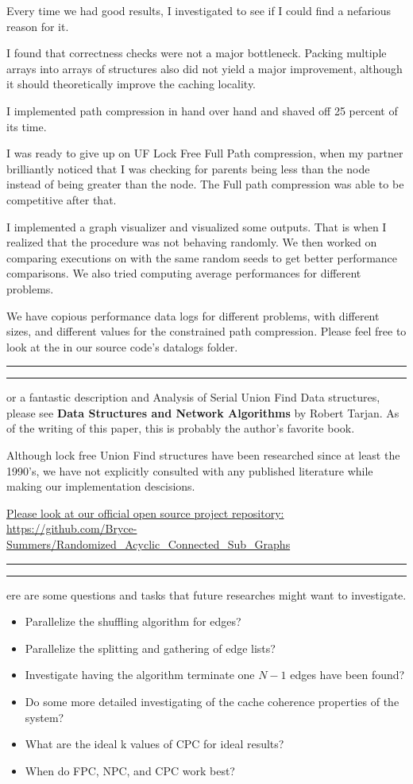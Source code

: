 \documentclass[11pt]{article}
\newcommand{\question}[2] {\vspace{.25in} \hrule\vspace{0.5em}
\noindent{\bf #1: #2} \vspace{0.5em}
\hrule \vspace{.10in}}
\begin{document}
Every time we had good results, I investigated to see if I could find a nefarious reason for it.

I found that correctness checks were not a major bottleneck. Packing multiple arrays into arrays of structures also did not yield a major improvement, although it should theoretically improve the caching locality.

I implemented path compression in hand over hand and shaved off 25 percent of its time.

I was ready to give up on UF Lock Free Full Path compression, when my partner brilliantly noticed that I was checking for parents being less than the node instead of being greater than the node. The Full path compression was able to be competitive after that.

I implemented a graph visualizer and visualized some outputs. That is when I realized that the procedure was not behaving randomly. We then worked on comparing executions on with the same random seeds to get better performance comparisons. We also tried computing average performances for different problems.

We have copious performance data logs for different problems, with different sizes, and different values for the constrained path compression. Please feel free to look at the in our source code's datalogs folder.


\newpage

\question{References}

For a fantastic description and Analysis of Serial Union Find Data structures, please see \textbf{Data Structures and Network Algorithms} by Robert Tarjan. As of the writing of this paper, this is probably the author's favorite book.


Although lock free Union Find structures have been researched since at least the 1990's, we have not explicitly consulted with any  published literature while making our implementation descisions.

\href{https://github.com/Bryce-Summers/Randomized_Acyclic_Connected_Sub_Graphs}{Please look at our official open source project repository:}\\
\url{https://github.com/Bryce-Summers/Randomized_Acyclic_Connected_Sub_Graphs} 


\question{Potential Future Work}

Here are some questions and tasks that future researches might want to investigate.

\begin{itemize}
\item Parallelize the shuffling algorithm for edges?
\item Parallelize the splitting and gathering of edge lists?
\item Investigate having the algorithm terminate one $N - 1$ edges have been found?
\item Do some more detailed investigating of the cache coherence properties of the system?
\item What are the ideal k values of CPC for ideal results?
\item When do FPC, NPC, and CPC work best?
\end{itemize}
\end{document}
